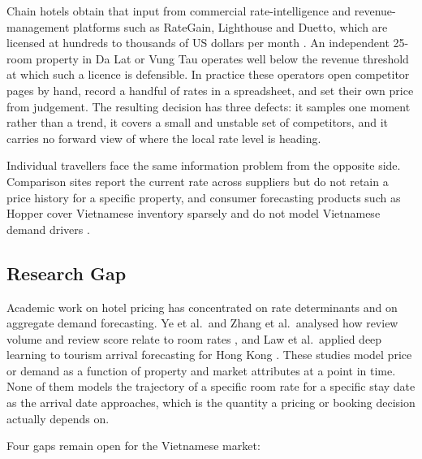 Chain hotels obtain that input from commercial rate-intelligence and revenue-management platforms such as RateGain, Lighthouse and Duetto, which are licensed at hundreds to thousands of US dollars per month \cite{lighthouse2025, rategain2025}. An independent 25-room property in Da Lat or Vung Tau operates well below the revenue threshold at which such a licence is defensible. In practice these operators open competitor pages by hand, record a handful of rates in a spreadsheet, and set their own price from judgement. The resulting decision has three defects: it samples one moment rather than a trend, it covers a small and unstable set of competitors, and it carries no forward view of where the local rate level is heading.

Individual travellers face the same information problem from the opposite side. Comparison sites report the current rate across suppliers but do not retain a price history for a specific property, and consumer forecasting products such as Hopper cover Vietnamese inventory sparsely and do not model Vietnamese demand drivers \cite{hopper2025}.

\subsection{Research Gap}

Academic work on hotel pricing has concentrated on rate determinants and on aggregate demand forecasting. Ye et al.\ and Zhang et al.\ analysed how review volume and review score relate to room rates \cite{ye2009, zhang2011}, and Law et al.\ applied deep learning to tourism arrival forecasting for Hong Kong \cite{law2019}. These studies model price or demand as a function of property and market attributes at a point in time. None of them models the trajectory of a specific room rate for a specific stay date as the arrival date approaches, which is the quantity a pricing or booking decision actually depends on.

Four gaps remain open for the Vietnamese market:

